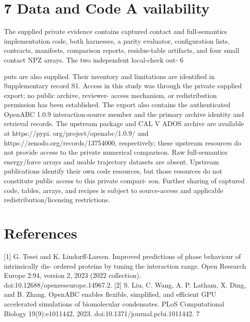 \documentclass[11pt]{article}
\begin{document}
\section*{7 Data and Code A vailability}

The supplied private evidence contains captured contact and full-semantics implementation code,
both harnesses, a parity evaluator, configuration lists, contracts, manifests, comparison reports,
residue-table artifacts, and four small contact NPZ arrays. The two independent local-check out-
6

puts are also supplied. Their inventory and limitations are identified in Supplementary record
S1. Access in this study was through the private supplied export; no public archive, reviewer-
access mechanism, or redistribution permission has been established. The export also contains
the authenticated OpenABC 1.0.9 interaction-source member and the primary archive identity and
retrieval records. The upstream package and CAL V ADOS archive are available at https://pypi.
org/project/openabc/1.0.9/ and https://zenodo.org/records/13754000, respectively; these
upstream resources do not provide access to the private numerical comparison. Raw full-semantics
energy/force arrays and usable trajectory datasets are absent. Upstream publications identify their
own code resources, but those resources do not constitute public access to this private compari-
son. Further sharing of captured code, tables, arrays, and recipes is subject to source-access and
applicable redistribution/licensing restrictions.

\section*{References}

[1] G. Tesei and K. Lindorff-Larsen. Improved predictions of phase behaviour of intrinsically dis-
ordered proteins by tuning the interaction range. Open Research Europe 2:94, version 2, 2023
(2022 collection). doi:10.12688/openreseurope.14967.2.
[2] S. Liu, C. Wang, A. P. Latham, X. Ding, and B. Zhang. OpenABC enables flexible, simplified,
and efficient GPU accelerated simulations of biomolecular condensates. PLoS Computational
Biology 19(9):e1011442, 2023. doi:10.1371/journal.pcbi.1011442.
7
\end{document}
